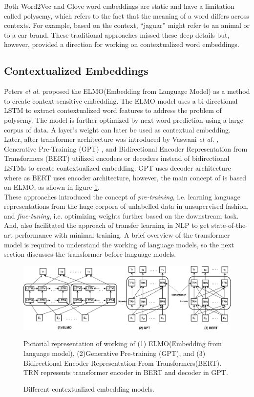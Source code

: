 \documentclass[%
	BCOR=8mm, %
	DIV=12,
	toc=bibliography, %
	toc=listof, %
	oneside, %
	egregdoesnotlikesansseriftitles, %
	]{scrbook}
\begin{document}
 Both Word2Vec and Glove word embeddings are static and have a limitation called polysemy, which refers to the fact that the meaning of a word differs across contexts. For example, based on the context, ``jaguar'' might refer to an animal or to a car brand. These traditional approaches missed these deep details but, however, provided a direction for working on contextualized word embeddings.

 \subsection{Contextualized Embeddings}
 \label{subsection:contextembeddings}
 Peters \textit{et al.} \cite{peters_deep_2018-3} proposed the ELMO(Embedding from Language Model) as a method to create context-sensitive embedding. The ELMO model uses a bi-directional LSTM to extract contextualized word features to address the problem of polysemy. The model is further optimized by next word prediction using a large corpus of data. A layer's weight can later be used as contextual embedding. \\
 Later, after transformer architecture was introduced by  Vaswani \textit{et al.} \cite{vaswani_attention_2017}, Generative Pre-Training (GPT) \cite{radford_improving_2018-1}, and Bidirectional Encoder Representation from Transformers (BERT) \cite{devlin_bert_2019-1} utilized  encoders or decoders instead of bidirectional LSTMs to create contextualized embedding. GPT uses decoder architecture where as BERT uses encoder architecture, however, the main concept of is based on ELMO, as shown in figure \ref{fig:elmo}. \\
These approaches introduced the concept of \textit{pre-training}, i.e. learning language representations from the huge corpora of unlabelled data in unsupervised fashion, and \textit{fine-tuning}, i.e. optimizing weights further based on the downstream task. And, also facilitated the approach of transfer learning in NLP to get state-of-the-art performance with minimal training. A brief overview of the transformer model is required to understand the working of language models, so the next section discusses the transformer before language models.
\begin{figure}[h!]
    \centering
    \includegraphics[width=1.0\linewidth]{img/elmo}
    \caption{Different contextualized embedding models.}{Pictorial representation of working of (1) ELMO(Embedding from language model),  (2)Generative Pre-training (GPT), and (3) Bidirectional Encoder Representation From Transformers(BERT). TRN represents transformer encoder in BERT and decoder in GPT.}
    \label{fig:elmo}
\end{figure}
\end{document}
